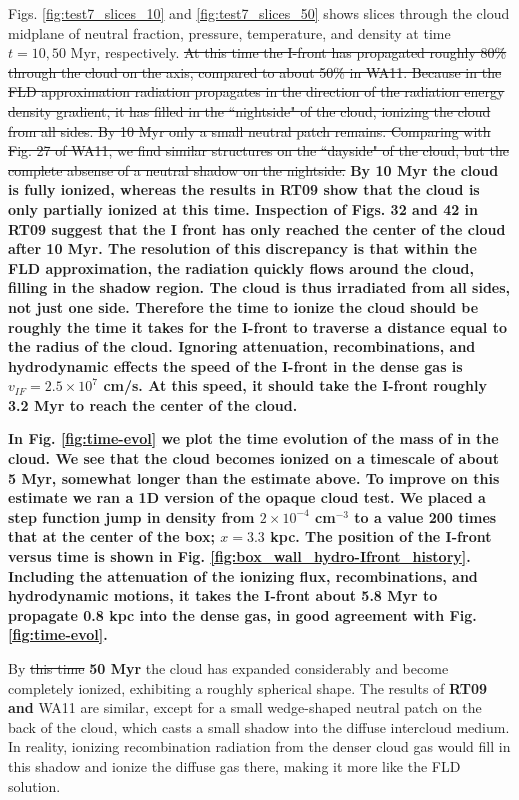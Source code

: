 Figs. \ref{fig:test7_slices_10} and \ref{fig:test7_slices_50}  shows slices through the cloud midplane of neutral fraction, pressure, temperature, and 
density at time $t=10, 50$ Myr, respectively. \st{At this time the I-front has propagated roughly 80\% through the cloud on the axis, compared to 
about 50\% in WA11. Because in the FLD approximation radiation propagates in the direction of the radiation energy density gradient,
it has filled in the  ``nightside" of the cloud, ionizing the cloud from all sides. By 10 Myr only a small neutral patch remains. 
Comparing with Fig. 27 
of WA11, we find similar structures on the ``dayside" of the cloud, but the complete absense of a neutral shadow on 
the nightside. }
{\bf By 10 Myr the cloud is fully ionized, whereas the results in RT09 show that the cloud is only partially ionized at this time. Inspection of Figs. 32 and 42 in RT09 suggest that the I front has only reached the center of the cloud after 10 Myr. The resolution of this discrepancy is that within the FLD approximation, the radiation quickly flows around the cloud, filling in the shadow region. The cloud is thus irradiated from all sides, not just one side. Therefore the time to ionize the cloud should be roughly the time it takes for the I-front to traverse a distance equal to the radius of the cloud. Ignoring attenuation, recombinations, and hydrodynamic effects the speed of the I-front in the dense gas is $v_{IF}=2.5 \times 10^7$ cm/s.  At this speed, it should take the I-front roughly 3.2 Myr to  reach the center of the cloud. }

{\bf In Fig. \ref{fig:time-evol} we plot the time evolution of the mass of \hi in the cloud. We see that the cloud becomes ionized on a timescale of about 5 Myr, somewhat longer than the estimate above. To improve on this estimate we ran a 1D version of the opaque cloud test. We placed a step function jump in density from $2 \times 10^{-4}$ cm$^{-3}$ to a value 200 times that at the center of the box; $x=3.3$ kpc. The position of the I-front versus time is shown in Fig. \ref{fig:box_wall_hydro-Ifront_history}. Including the attenuation of the ionizing flux, recombinations, and hydrodynamic motions, it takes the I-front about 5.8 Myr to propagate 0.8 kpc into the dense gas, in good agreement with Fig. \ref{fig:time-evol}.  }


By \st{this time} {\bf 50 Myr} the cloud has
expanded considerably and become completely ionized, exhibiting a roughly spherical shape. 
The results of {\bf RT09 and} WA11 are similar, except for a small wedge-shaped neutral patch on the back of the cloud, which casts 
a small shadow into the diffuse intercloud medium. 
In reality, ionizing recombination radiation from the denser cloud gas would fill in this shadow and ionize the 
diffuse gas there, making it more like the FLD solution. 

